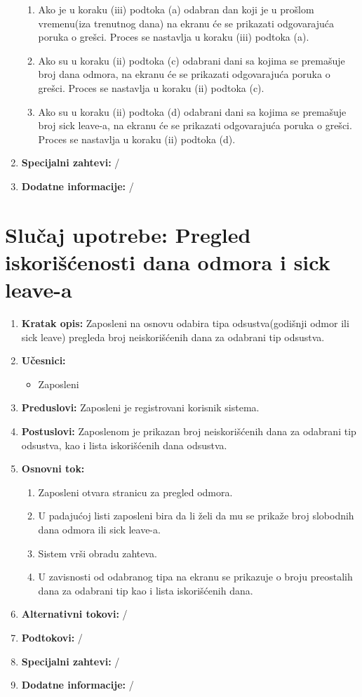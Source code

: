 \documentclass[a4paper]{article}
\begin{document}
\begin{enumerate}
            \begin{enumerate}
                \item Ako je u koraku (iii) podtoka (a) odabran dan koji je u prošlom vremenu(iza trenutnog dana) na ekranu će se prikazati odgovarajuća poruka o grešci. Proces se nastavlja u koraku (iii) podtoka (a).
                \item Ako su u koraku (ii) podtoka (c) odabrani dani sa kojima se premašuje broj dana odmora, na ekranu će se prikazati odgovarajuća poruka o grešci. Proces se nastavlja u koraku (ii) podtoka (c).
                \item Ako su u koraku (ii) podtoka (d) odabrani dani sa kojima se premašuje broj sick leave-a, na ekranu će se prikazati odgovarajuća poruka o grešci. Proces se nastavlja u koraku (ii) podtoka (d). 
            \end{enumerate}
    \item \textbf{Specijalni zahtevi:} /
    \item \textbf{Dodatne informacije:} /
\end{enumerate}

\section{Slučaj upotrebe: Pregled iskorišćenosti dana odmora i sick leave-a}
\begin{enumerate}
    \item \textbf{Kratak opis:} Zaposleni na osnovu odabira tipa odsustva(godišnji odmor ili sick leave) pregleda broj neiskorišćenih dana za odabrani tip odsustva.
    \item \textbf{Učesnici:}
        \begin{itemize}
            \item Zaposleni
        \end{itemize}
    \item \textbf{Preduslovi:} Zaposleni je registrovani korisnik sistema.
    \item \textbf{Postuslovi:} Zaposlenom je prikazan broj neiskorišćenih dana za odabrani tip odsustva, kao i lista iskorišćenih dana odsustva.
    \item \textbf{Osnovni tok:}
        \begin{enumerate}
            \item Zaposleni otvara stranicu za pregled odmora.
            \item U padajućoj listi zaposleni bira da li želi da mu se prikaže broj slobodnih dana odmora ili sick leave-a.
            \item Sistem vrši obradu zahteva.
            \item U zavisnosti od odabranog tipa na ekranu se prikazuje o broju preostalih dana za odabrani tip kao i lista iskorišćenih dana.
        \end{enumerate}
    \item \textbf{Alternativni tokovi:} /
    \item \textbf{Podtokovi:} /
    \item \textbf{Specijalni zahtevi:} /
    \item \textbf{Dodatne informacije:} /
\end{enumerate}
\end{document}

